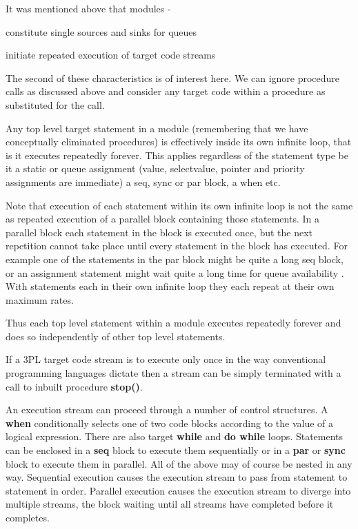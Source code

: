             It was mentioned above that modules -
            \blist
            \item   constitute single sources and sinks for queues
            \item   initiate repeated execution of target code streams
            \blend

            The second of these characteristics is of interest here. We can
            ignore procedure calls as discussed above and consider any target
            code within a procedure as substituted for the call.

            Any top level target statement in a module (remembering
            that we have conceptually eliminated procedures) is effectively
            inside its own infinite loop, that is it executes repeatedly
            forever. This applies regardless of the statement type be it a
            static or queue assignment (value, selectvalue, pointer and
            priority assignments are immediate) a seq, sync or par block, a
            when etc.

            Note that execution of each statement within its own infinite loop is
            not the same as repeated execution of a parallel block containing those
            statements. In a parallel block each statement in the block is executed
            once, but the next repetition cannot take place until every statement
            in the block has executed. For example one of the statements in the par
            block might be quite a long seq block, or an assignment statement might
            wait quite a long time for queue availability .
            With statements each in their own infinite loop they each repeat at
            their own maximum rates.

            Thus each top level statement within a module executes repeatedly
            forever and does so independently of other top level statements.

            If a 3PL target code stream is to execute only once in the way
            conventional programming languages dictate then a stream can be
            simply terminated with a call to inbuilt procedure {\bf stop()}.

            An execution stream can proceed through a number of control
            structures. A {\bf when} conditionally selects one of two code
            blocks according to the value of a logical expression. There are
            also target {\bf while} and {\bf do while} loops. Statements can
            be enclosed in a {\bf seq} block to execute them sequentially or
            in a {\bf par} or {\bf sync} block to execute them in parallel.
            All of the above may of course be nested in any way. Sequential
            execution causes the execution stream to pass from statement to
            statement in order. Parallel execution causes the execution
            stream to diverge into multiple streams, the block waiting until
            all streams have completed before it completes.
            
